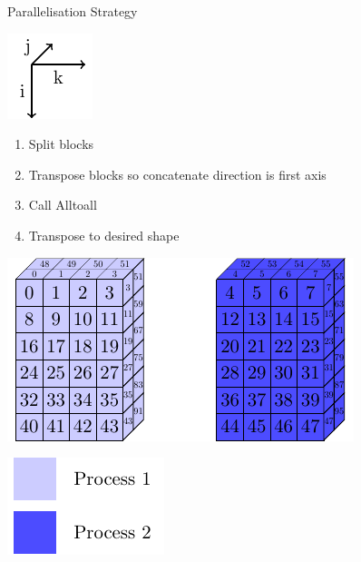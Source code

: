 \documentclass{beamer}
\begin{document}
\begin{frame}{Parallelisation Strategy}
 \begin{minipage}{.3\textwidth}
 \includegraphics[width=.4\textwidth]{SplitConcat3D/Axes}
 \vspace{1em}
 
  \begin{enumerate}
   \item Split blocks 
   \item Transpose blocks so concatenate direction is first axis
   \item Call Alltoall
   \item Transpose to desired shape
  \end{enumerate}
  
  \vspace{1em}
 \end{minipage}
 \begin{minipage}{.65\textwidth}
  \includegraphics[width=\textwidth]{SplitConcat3D/RecvDistrib2}
  
  \vspace{1em}
  
  \hfill\includegraphics[width=.3\textwidth]{SplitConcat3D/Legend}
 \end{minipage}
\end{frame}
\end{document}

